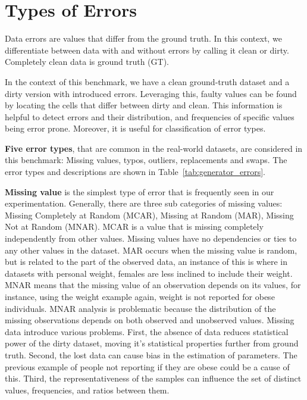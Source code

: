 \section{Types of Errors}
\label{sec:error_types}

Data errors are values that differ from the ground truth.
In this context, we differentiate between data with and without errors by calling it clean or dirty. 
Completely clean data is ground truth (GT).  


In the context of this benchmark, we have a clean ground-truth dataset and a dirty version with introduced errors.  
Leveraging this, faulty values can be found by locating the cells that differ between dirty and clean. 
This information is helpful to detect errors and their distribution, and frequencies of specific values being error prone.  
Moreover, it is useful for classification of error types.


\textbf{Five error types}, that are common in the real-world datasets, are considered in this benchmark: 
Missing values, typos, outliers, replacements and swaps. 
The error types and descriptions are shown in Table~\ref{tab:generator_errors}.


\textbf{Missing value} is the simplest type of error that is frequently seen in our experimentation. 
Generally, there are three sub categories of missing values: 
Missing Completely at Random (MCAR), Missing at Random (MAR), Missing Not at Random (MNAR). 
MCAR is a value that is missing completely independently from other values. 
Missing values have no dependencies or ties to any other values in the dataset. 
MAR occurs when the missing value is random, but is related to the part of the observed data, an instance of this is where in datasets with personal weight, females are less inclined to include their weight. 
MNAR means that the missing value of an observation depends on its values, for instance, using the weight example again, weight is not reported for obese individuals.
MNAR analysis is problematic because the distribution of the missing observations depends on both observed and unobserved values.
Missing data introduce various problems. 
First, the absence of data reduces statistical power of the dirty dataset, moving it's statistical properties further from ground truth.
Second, the lost data can cause bias in the estimation of parameters. The previous example of people not reporting if they are obese could be a cause of this. 
Third, the representativeness of the samples can influence the set of distinct values, frequencies, and ratios between them.


